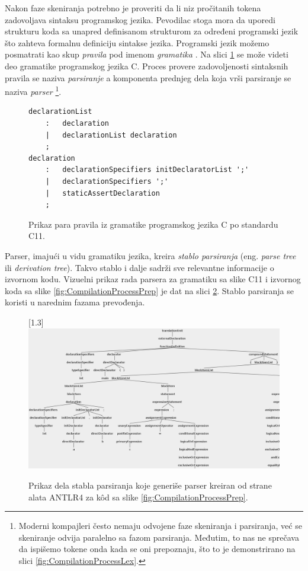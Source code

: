 Nakon faze skeniranja potrebno je proveriti da li niz pročitanih tokena zadovoljava sintaksu programskog jezika. Pevodilac stoga mora da uporedi strukturu koda sa unapred definisanom strukturom za određeni programski jezik što zahteva formalnu definiciju sintakse jezika. Programski jezik možemo posmatrati kao skup \emph{pravila} pod imenom \emph{gramatika} \cite{ContextFreeGrammars}. Na slici \ref{fig:CompilationProcessGram} se može videti deo gramatike programskog jezika C. Proces provere zadovoljenosti sintaksnih pravila se naziva \emph{parsiranje} a komponenta prednjeg dela koja vrši parsiranje se naziva \emph{parser} \footnote{Moderni kompajleri često nemaju odvojene faze skeniranja i parsiranja, već se skeniranje odvija paralelno sa fazom parsiranja. Međutim, to nas ne sprečava da ispišemo tokene onda kada se oni prepoznaju, što to je demonstrirano na slici \ref{fig:CompilationProcessLex}.}.

\begin{figure}[h!]
\begin{lstlisting}[language={}]
declarationList
    :   declaration
    |   declarationList declaration
    ;
declaration
    :   declarationSpecifiers initDeclaratorList ';'
    | 	declarationSpecifiers ';'
    |   staticAssertDeclaration
    ;
\end{lstlisting}
\caption{Prikaz para pravila iz gramatike programskog jezika C po standardu C11.}
\label{fig:CompilationProcessGram}
\end{figure}

Parser, imajući u vidu gramatiku jezika, kreira \emph{stablo parsiranja} (eng. \emph{parse tree} ili \emph{derivation tree}). Takvo stablo i dalje sadrži sve relevantne informacije o izvornom kodu. Vizuelni prikaz rada parsera za gramatiku sa slike C11 i izvornog koda sa slike \ref{fig:CompilationProcessPrep} je dat na slici \ref{fig:CompilationProcessPars}. Stablo parsiranja se koristi u narednim fazama prevođenja.

\begin{figure}[h!]
\centering
\scalebox{0.95}[1.3] {
    \includegraphics[width=\textwidth]{images/parse_tree.png}
}
\caption{Prikaz dela stabla parsiranja koje generiše parser kreiran od strane alata ANTLR4 \cite{ANTLR} za k\^od sa slike \ref{fig:CompilationProcessPrep}.}
\label{fig:CompilationProcessPars}
\end{figure}

